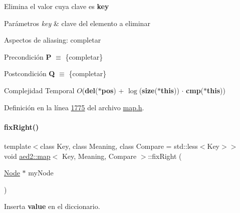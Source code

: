 Elimina el valor cuya clave es {\bfseries key} 


\begin{DoxyParams}{Parámetros}
{\em key} & clave del elemento a eliminar\\
\hline
\end{DoxyParams}
\begin{DoxyParagraph}{Aspectos de aliasing\+:}
completar
\end{DoxyParagraph}
\begin{DoxyPrecond}{Precondición}
{\bfseries P} $\equiv$ \{completar\} 
\end{DoxyPrecond}
\begin{DoxyPostcond}{Postcondición}
{\bfseries Q} $\equiv$ \{completar\}
\end{DoxyPostcond}

\begin{DoxyDescription}
\item[Complejidad Temporal]$O$({\bfseries del}({\bfseries $\ast$pos}) + $\log$({\bfseries size}({\bfseries $\ast$this})) $\cdot$ {\bfseries cmp}({\bfseries $\ast$this}))
\end{DoxyDescription}

Definición en la línea \hyperlink{map_8h_source_l01775}{1775} del archivo \hyperlink{map_8h_source}{map.\+h}.

\mbox{\label{classaed2_1_1map_ae908761d06411046290cf49a5e0618bd_ae908761d06411046290cf49a5e0618bd}} 
\paragraph{\texorpdfstring{fix\+Right()}{fixRight()}}
{\footnotesize\ttfamily template$<$class Key, class Meaning, class Compare = std\+::less$<$\+Key$>$$>$ \\
void \hyperlink{classaed2_1_1map}{aed2\+::map}$<$ Key, Meaning, Compare $>$\+::fix\+Right (\begin{DoxyParamCaption}\item[{\hyperlink{structaed2_1_1map_1_1Node}{Node} $\ast$}]{my\+Node }\end{DoxyParamCaption})\hspace{0.3cm}{\ttfamily [inline]}}



Inserta {\bfseries value} en el diccionario. 

